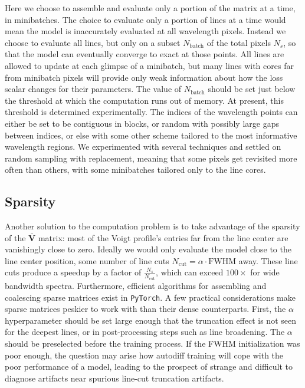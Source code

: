 \documentclass[modern]{aastex631}
\begin{document}
Here we choose to assemble and evaluate only a portion of the matrix at a time, in minibatches.  The choice to evaluate only a portion of lines at a time would mean the model is inaccurately evaluated at all wavelength pixels.  Instead we choose to evaluate all lines, but only on a subset $N_{\mathrm{batch}}$ of the total pixels $N_s$, so that the model can eventually converge to exact at those points.  All lines are allowed to update at each glimpse of a minibatch, but many lines with cores far from minibatch pixels will provide only weak information about how the loss scalar changes for their parameters.  The value of $N_{\mathrm{batch}}$ should be set just below the threshold at which the computation runs out of memory.  At present, this threshold is determined experimentally.  The indices of the wavelength points can either be set to be contiguous in blocks, or random with possibly large gaps between indices, or else with some other scheme tailored to the most informative wavelength regions.  We experimented with several techniques and settled on random sampling with replacement, meaning that some pixels get revisited more often than others, with some minibatches tailored only to the line cores.



\subsection{Sparsity}

Another solution to the computation problem is to take advantage of the sparsity of the $\bm{\bar{V}}$ matrix: most of the Voigt profile's entries far from the line center are vanishingly close to zero.  Ideally we would only evaluate the model close to the line center position, some number of line cuts $N_{\mathrm{cut}}=\alpha \cdot \mathrm{FWHM}$ away.  These line cuts produce a speedup by a factor of $\frac{N_s}{N_{\mathrm{cut}}}$, which can exceed $100\times$ for wide bandwidth spectra. Furthermore, efficient algorithms for assembling and coalescing sparse matrices exist in \texttt{PyTorch}.  A few practical considerations make sparse matrices peskier to work with than their dense counterparts.  First, the $\alpha$ hyperparameter should be set large enough that the truncation effect is not seen for the deepest lines, or in post-processing steps such as line broadening.  The $\alpha$ should be preselected before the training process.  If the FWHM initialization was poor enough, the question may arise how autodiff training will cope with the poor performance of a model, leading to the prospect of strange and difficult to diagnose artifacts near spurious line-cut truncation artifacts.
\end{document}
